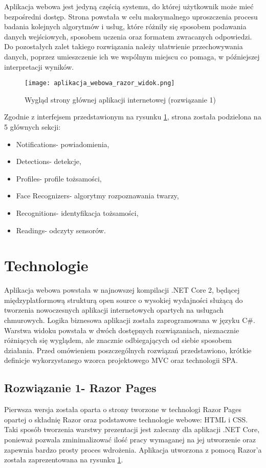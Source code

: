 Aplikacja webowa jest jedyną częścią systemu, do której użytkownik może mieć bezpośredni dostęp. Strona powstała w celu maksymalnego uproszczenia procesu badania kolejnych algorytmów i usług, które różniły się sposobem podawania danych wejściowych, sposobem uczenia oraz formatem zwracanych odpowiedzi. Do pozostałych zalet takiego rozwiązania należy ułatwienie przechowywania danych, poprzez umieszczenie ich we wspólnym miejscu co pomaga, w późniejszej interpretacji wyników.
\begin{figure}[H]
	\centering
	\texttt{[image: aplikacja\_webowa\_razor\_widok.png]}
	\caption{Wygląd strony głównej aplikacji internetowej (rozwiązanie 1)}
	\label{fig:strona_glowna_razor}
\end{figure}
\pagebreak
Zgodnie z interfejsem przedstawionym na rysunku \ref{fig:strona_glowna_razor}, strona została podzielona na 5 głównych sekcji:
\begin{itemize}
\item Notifications- powiadomienia,
\item Detections- detekcje,
\item Profiles- profile tożsamości,
\item Face Recognizers- algorytmy rozpoznawania twarzy,
\item Recognitions- identyfikacja tożsamości,
\item Readings- odczyty sensorów.
\end{itemize}

\section{Technologie}\label{s:web_technologie}
Aplikacja webowa powstała w najnowszej kompilacji .NET Core 2, będącej międzyplatformową strukturą open source o wysokiej wydajności służącą do tworzenia nowoczesnych aplikacji internetowych opartych na usługach chmurowych. Logika biznesowa aplikacji została zaprogramowana w języku C\#. Warstwa widoku powstała w dwóch dostępnych rozwiązaniach, nieznacznie różniących się wyglądem, ale znacznie odbiegających od siebie sposobem działania. Przed omówieniem poszczególnych rozwiązań przedstawiono, krótkie definicje wykorzystanego wzorca projektowego MVC oraz technologii SPA. 

\subsection{Rozwiązanie 1- Razor Pages}
Pierwsza wersja została oparta o strony tworzone w technologi Razor Pages opartej o składnię Razor oraz podstawowe technologie webowe: HTML i CSS. Taki sposób tworzenia warstwy prezentacji jest zalecany dla aplikacji .NET Core, ponieważ pozwala zminimalizować ilość pracy wymaganej na jej utworzenie oraz zapewnia bardzo prosty proces wdrożenia. Aplikacja utworzona z pomocą Razor'a została zaprezentowana na rysunku \ref{fig:strona_glowna_razor}.

